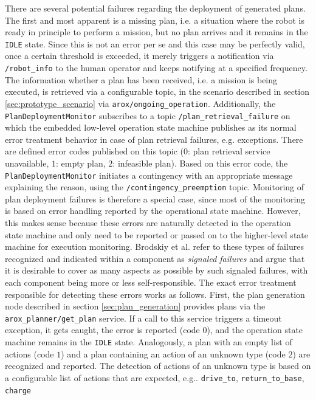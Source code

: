 \documentclass[english, master, utf8]{base/thesis_KBS}
\newcommand{\code}[1]{\colorbox{light-gray}{\texttt{#1}}}
\begin{document}
There are several potential failures regarding the deployment of generated plans. The first and most apparent is a missing plan, i.e. a situation where the robot is ready in
principle to perform a mission, but no plan arrives and it remains in the \code{IDLE} state. Since this is not an error per se and this case may be perfectly valid, once a certain
threshold is exceeded, it merely triggers a notification via \code{/robot\_info} to the human operator and keeps notifying at a specified frequency. The information whether a plan
has been received, i.e. a mission is being executed, is retrieved via a configurable topic, in the scenario described in section \ref{sec:prototype_scenario} via
\code{arox/ongoing\_operation}. Additionally, the \code{PlanDeploymentMonitor} subscribes to a topic \code{/plan\_retrieval\_failure} on which the embedded low-level operation state
machine publishes as its normal error treatment behavior in case of plan retrieval failures, e.g. exceptions. There are defined error codes published on this topic ($0$: plan
retrieval service unavailable, $1$: empty plan, $2$: infeasible plan). Based on this error code, the \code{PlanDeploymentMonitor} initiates a contingency with an appropriate message
explaining the reason, using the \code{/contingency\_preemption} topic. Monitoring of plan deployment failures is
therefore a special case, since most of the monitoring is based on error handling reported by the operational state machine. However, this makes sense because these errors are
naturally detected in the operation state machine and only need to be reported or passed on to the higher-level state machine for execution monitoring. Brodskiy et al. refer to these
types of failures recognized and indicated within a component as \textit{signaled failures} and argue that it is desirable to cover as many aspects as possible by such signaled
failures, with each component being more or less self-responsible. \cite{Brodskiy:2011}
The exact error treatment responsible for detecting these errors works as follows. First, the plan generation node described in section \ref{sec:plan_generation} provides plans via the
\code{arox\_planner/get\_plan} service. If a call to this service triggers a timeout exception, it gets caught, the error is reported (code $0$), and the operation state machine
remains in the \code{IDLE} state. Analogously, a plan with an empty list of actions (code $1$) and a plan containing an action of an unknown type (code $2$) are recognized and
reported. The detection of actions of an unknown type is based on a configurable list of actions that are expected, e.g.. \code{drive\_to}, \code{return\_to\_base}, \code{charge}
\end{document}
